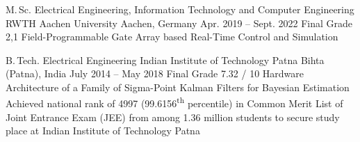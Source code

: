 
\begin{cveducation}

\cvschool
	{M.\,Sc.} %
	{Electrical Engineering, Information Technology and Computer Engineering} %
	{RWTH Aachen University} %
	{Aachen, Germany  {\acvHeaderIconSep{}} {} } %
	{Apr. 2019 -- Sept. 2022  {\acvHeaderIconSep{}} {} } %
	{Final Grade 2,1  {\acvHeaderIconSep{}} {} } %
	{Field-Programmable Gate Array based Real-Time Control and Simulation} %
	{}

\cvschool
	{B.\,Tech.} %
	{Electrical Engineering} %
	{Indian Institute of Technology Patna} %
	{Bihta (Patna), India  {\acvHeaderIconSep{}} {} } %
	{July 2014 -- May 2018  {\acvHeaderIconSep{}} {} } %
	{Final Grade 7.32 / 10  {\acvHeaderIconSep{}} {} } %
	{Hardware Architecture of a Family of Sigma-Point Kalman Filters for Bayesian Estimation} %
	{Achieved national rank of 4997 (99.6156\textsuperscript{th} percentile) in Common Merit List of Joint Entrance Exam (JEE) from among 1.36 million students to secure study place at Indian Institute of Technology Patna} %



\end{cveducation}
